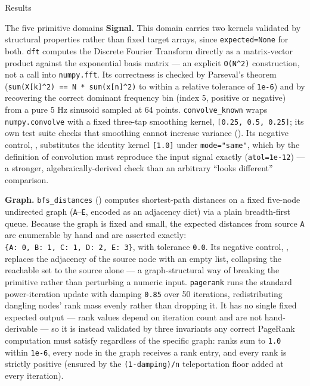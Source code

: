 \documentclass[
  ignorenonframetext,
]{beamer}
\begin{document}
\begin{frame}{Results}
\begin{block}{The five primitive domains}
\textbf{Signal.} This domain carries two kernels validated by structural
properties rather than fixed target arrays, since \texttt{expected=None}
for both. \texttt{dft} computes the Discrete Fourier Transform directly
as a matrix-vector product against the exponential basis matrix
 --- an explicit \texttt{O(N\^{}2)}
construction, not a call into \texttt{numpy.fft}. Its correctness is
checked by Parseval's theorem
(\texttt{sum(\textbar{}X{[}k{]}\textbar{}\^{}2)\ ==\ N\ *\ sum(\textbar{}x{[}n{]}\textbar{}\^{}2)}
to within a relative tolerance of \texttt{1e-6}) and by recovering the
correct dominant frequency bin (index 5, positive or negative) from a
pure 5 Hz sinusoid sampled at 64 points. \texttt{convolve\_known} wraps
\texttt{numpy.convolve} with a fixed three-tap smoothing kernel,
\texttt{{[}0.25,\ 0.5,\ 0.25{]}}; its own test suite checks that
smoothing cannot increase variance
(). Its
negative control, , substitutes the
identity kernel \texttt{{[}1.0{]}} under \texttt{mode="same"}, which by
the definition of convolution must reproduce the input signal exactly
(\texttt{atol=1e-12}) --- a stronger, algebraically-derived check than
an arbitrary ``looks different'' comparison.

\textbf{Graph.} \texttt{bfs\_distances}
() computes shortest-path distances on a
fixed five-node undirected graph (\texttt{A}--\texttt{E}, encoded as an
adjacency dict) via a plain breadth-first queue. Because the graph is
fixed and small, the expected distances from source \texttt{A} are
enumerable by hand and are asserted exactly:
\texttt{\{A:\ 0,\ B:\ 1,\ C:\ 1,\ D:\ 2,\ E:\ 3\}}, with tolerance
\texttt{0.0}. Its negative control, ,
replaces the adjacency of the source node with an empty list, collapsing
the reachable set to the source alone --- a graph-structural way of
breaking the primitive rather than perturbing a numeric input.
\texttt{pagerank} runs the standard power-iteration update with damping
\texttt{0.85} over 50 iterations, redistributing dangling nodes' rank
mass evenly rather than dropping it. It has no single fixed expected
output --- rank values depend on iteration count and are not
hand-derivable --- so it is instead validated by three invariants any
correct PageRank computation must satisfy regardless of the specific
graph: ranks sum to \texttt{1.0} within \texttt{1e-6}, every node in the
graph receives a rank entry, and every rank is strictly positive
(ensured by the \texttt{(1-damping)/n} teleportation floor added at
every iteration).


\end{block}
\end{frame}
\end{document}
